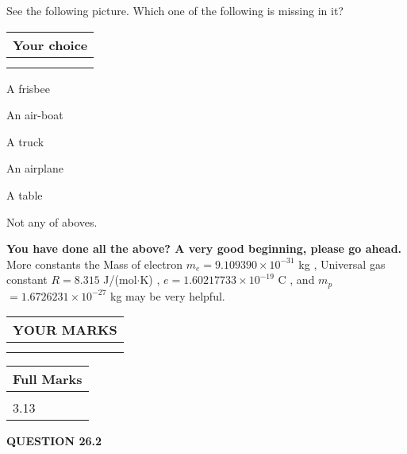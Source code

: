 \documentclass[12pt]{article}
\begin{document}
  
See the following picture.
Which one of the following is missing in it?
  
  
\noindent\hspace{3.0in} \begin{tabular}{|l|}
\hline
Your choice \\
\hline
 \\ 
 \\ 
\hline
\end{tabular}
  
  
 
 
A frisbee
 
 
An air-boat
 
 
A truck
 
 
An airplane
 
 
A table
 
 
  Not any of aboves.
 
 
 
\vspace{0.3in}
   
   
\vspace{0.3in}
{\textbf{\LARGE{You have done all the above? A very good beginning, please go ahead.}}}
More constants the
Mass of electron
$m_e$$ =
9.109390 \times 10^{-31} $
kg
,
Universal gas constant
$R$$ =
8.315 $
J/(mol$\cdot $K)
,
$e$$ =
1.60217733 \times 10^{-19} $
C
, and
$m_p$$ =
1.6726231 \times 10^{-27} $
kg
%
may be very helpful.
\vspace{0.3in}
   
   
  
\vspace{0.2in}
  
\noindent\begin{tabular}{|l|}
\hline
 YOUR MARKS  \\
\hline
 \\ 
 \\ 
\hline
\end{tabular}
\hspace{0.05in} \begin{tabular}{|l|}
\hline
 Full Marks  \\
\hline
 \\ 
3.13 \\
\hline
\end{tabular}
{\textbf{\Large{QUESTION
26.2 
}}}
  
\end{document}
